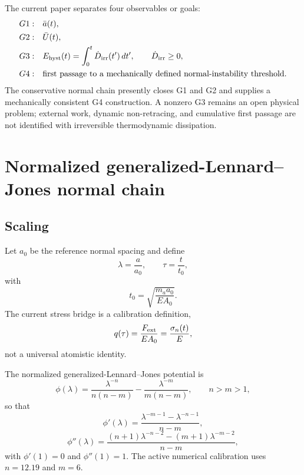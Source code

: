 \documentclass[11pt]{article}
\begin{document}
The current paper separates four observables or goals:
\begin{align}
G1:&\quad \bar a(t),\\
G2:&\quad \bar U(t),\\
G3:&\quad E_{\rm hyst}(t)=\int_0^t \dot D_{\rm irr}(t')\,dt',\qquad \dot D_{\rm irr}\ge 0,\\
G4:&\quad \text{first passage to a mechanically defined normal-instability threshold.}
\end{align}
The conservative normal chain presently closes G1 and G2 and supplies a mechanically consistent G4 construction. A nonzero G3 remains an open physical problem; external work, dynamic non-retracing, and cumulative first passage are not identified with irreversible thermodynamic dissipation.

\section{Normalized generalized-Lennard--Jones normal chain}
\subsection{Scaling}
Let \(a_0\) be the reference normal spacing and define
\begin{equation}
\lambda=\frac{a}{a_0},\qquad \tau=\frac{t}{t_0},
\end{equation}
with
\begin{equation}
t_0=\sqrt{\frac{m_a a_0}{E A_0}}.
\end{equation}
The current stress bridge is a calibration definition,
\begin{equation}
q(\tau)=\frac{F_{\rm ext}}{EA_0}=\frac{\sigma_n(t)}{E},
\end{equation}
not a universal atomistic identity.

The normalized generalized-Lennard--Jones potential is
\begin{equation}
\phi(\lambda)
=\frac{\lambda^{-n}}{n(n-m)}
-\frac{\lambda^{-m}}{m(n-m)},
\qquad n>m>1,
\end{equation}
so that
\begin{equation}
\phi'(\lambda)
=\frac{\lambda^{-m-1}-\lambda^{-n-1}}{n-m},
\end{equation}
\begin{equation}
\phi''(\lambda)
=\frac{(n+1)\lambda^{-n-2}-(m+1)\lambda^{-m-2}}{n-m},
\end{equation}
with \(\phi'(1)=0\) and \(\phi''(1)=1\). The active numerical calibration uses \(n=12.19\) and \(m=6\).
\end{document}
